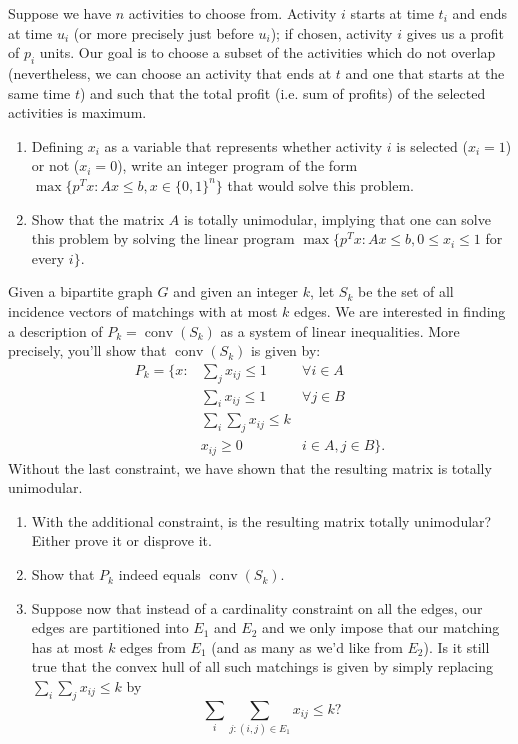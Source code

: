 \documentclass[12pt]{article}
\newcommand{\conv}{\operatorname{conv}}
\begin{document}
\begin{exercises}
\item Suppose we have $n$ activities to choose from. Activity $i$
  starts at time $t_i$ and ends at time $u_i$ (or more precisely just
  before $u_i$); if chosen, activity $i$ gives us a profit of $p_i$
  units. Our goal is to choose a subset of the activities which do not
  overlap (nevertheless, we can choose an activity that ends at $t$
  and one that starts at the same time $t$) and such that the total
  profit (i.e. sum of profits) of the selected activities is maximum.

\begin{enumerate}
\item
Defining $x_i$ as a variable that represents whether activity $i$ is
selected ($x_i=1$) or not ($x_i=0$), write an integer program of the
form $\max\{ p^T x: Ax \leq b, x\in\{0,1\}^n\}$ that
would solve this problem.  
\item
Show that the matrix $A$ is totally unimodular, implying that one can
solve this problem by solving the linear program 
  $\max\{ p^T x: Ax \leq b, 0\leq x_i\leq 1$ for every $i\}$.
\end{enumerate}

\item %
Given a bipartite graph $G$ and given an integer $k$, let $S_k$ be the
set of all incidence vectors of  matchings with at most $k$ edges. We
are interested in finding a description of $P_k=\conv(S_k)$ as a system of
linear inequalities. More precisely, you'll show that $\conv(S_k)$ is
given by:
$$\begin{array}{lll} 
P_k=\{x: & \sum_{j} x_{ij} \leq 1 & \forall i\in A \\
  & \sum_{i} x_{ij} \leq 1 & \forall j\in B \\
& \sum_{i} \sum_j x_{ij} \leq k \\
& x_{ij} \geq 0 & i\in A, j\in B \}.
\end{array}
$$
Without the last constraint, we have shown that the
resulting matrix is totally unimodular.
\begin{enumerate}
\item
With the additional constraint, is the resulting matrix totally
unimodular? Either prove it or disprove it. 
\item
Show that $P_k$ indeed equals $\conv(S_k)$. 

\item
Suppose now that instead of a cardinality constraint on all the edges,
our edges are partitioned into $E_1$ and $E_2$ and we only impose that
our matching has at most $k$ edges from $E_1$ (and as many as we'd
like from $E_2$). Is it still true that the convex hull of all such
matchings is given by simply replacing $\sum_i \sum_j x_{ij} \leq k$
by 
$$\sum_i \sum_{j: (i,j)\in E_1} x_{ij} \leq k ?$$ 
\end{enumerate}
\end{exercises}
\end{document}
